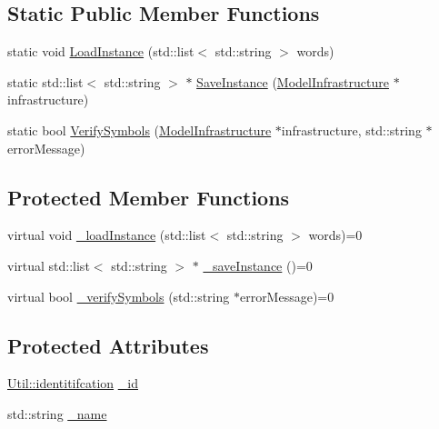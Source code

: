 \subsection*{Static Public Member Functions}
\begin{DoxyCompactItemize}
\item 
static void \hyperlink{class_model_infrastructure_a3e309d346ecc1a96c67a13f5f5f18bf4}{Load\-Instance} (std\-::list$<$ std\-::string $>$ words)
\item 
static std\-::list$<$ std\-::string $>$ $\ast$ \hyperlink{class_model_infrastructure_a4da62e3f3b294abc9e266d1dcfb830cc}{Save\-Instance} (\hyperlink{class_model_infrastructure}{Model\-Infrastructure} $\ast$infrastructure)
\item 
static bool \hyperlink{class_model_infrastructure_a8ac134e84f885300a188fcc0904f1848}{Verify\-Symbols} (\hyperlink{class_model_infrastructure}{Model\-Infrastructure} $\ast$infrastructure, std\-::string $\ast$error\-Message)
\end{DoxyCompactItemize}
\subsection*{Protected Member Functions}
\begin{DoxyCompactItemize}
\item 
virtual void \hyperlink{class_model_infrastructure_ae118c8ad2ac9d4397c40d004af51b2dc}{\-\_\-load\-Instance} (std\-::list$<$ std\-::string $>$ words)=0
\item 
virtual std\-::list$<$ std\-::string $>$ $\ast$ \hyperlink{class_model_infrastructure_a3da2fd381c44752598bc448b207e8287}{\-\_\-save\-Instance} ()=0
\item 
virtual bool \hyperlink{class_model_infrastructure_a43de089b35b96c32dd24ca4f9636a388}{\-\_\-verify\-Symbols} (std\-::string $\ast$error\-Message)=0
\end{DoxyCompactItemize}
\subsection*{Protected Attributes}
\begin{DoxyCompactItemize}
\item 
\hyperlink{class_util_ad17d458d9344b10bba64347e514d6d71}{Util\-::identitifcation} \hyperlink{class_model_infrastructure_af6fe00f683f5e29cbcd667e4d3bd24d0}{\-\_\-id}
\item 
std\-::string \hyperlink{class_model_infrastructure_aa73c0444ba8e3515e2aec3154eaad85d}{\-\_\-name}
\end{DoxyCompactItemize}


